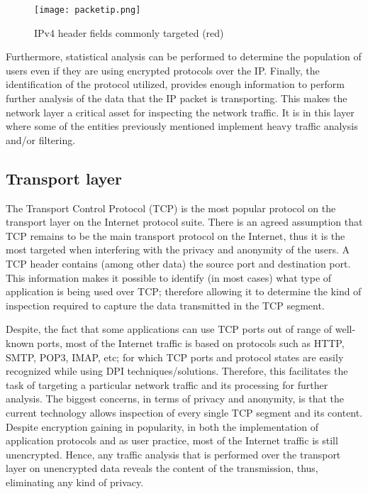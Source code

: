 \documentclass[conference]{IEEEtran}
\begin{document}
\begin{figure}[h]
  \centering
  \captionsetup{justification=centering}
  \texttt{[image: packetip.png]}
  \caption{IPv4 header fields commonly targeted (red)}
\end{figure}



Furthermore, statistical analysis can
be performed to determine the population of users even if they are
using encrypted protocols over the IP\cite{SWARM}. Finally, the
identification of the protocol utilized, provides enough information
to perform further analysis of the data that the IP packet is
transporting. This makes the network layer a critical asset for
inspecting the network traffic. It is in this layer where
some of the entities previously mentioned implement heavy traffic
analysis and/or filtering.

\subsection{Transport layer}

The Transport Control Protocol (TCP) is the most popular protocol
on the transport layer on the Internet protocol suite. There is an
agreed assumption that TCP remains to be the main transport protocol
on the Internet, thus it is the most targeted when interfering with the
privacy and anonymity of the users. A TCP header contains (among other
data) the source port and destination port. This information makes it
possible to identify (in most cases) what type of application
is being used over TCP; therefore allowing it to determine the kind of
inspection required to capture the data transmitted in the TCP
segment. 

Despite, the fact that some applications can use TCP ports out of range
of well-known ports, most of the Internet traffic is based on
protocols such as HTTP, SMTP, POP3, IMAP, etc; for which TCP ports and
protocol states are easily recognized while using DPI
techniques/solutions. Therefore, this facilitates the task of targeting
a particular network traffic and its processing for further
analysis. The biggest concerns, in terms of privacy and anonymity, is
that the current technology allows inspection of every single TCP segment
and its content. Despite encryption gaining in popularity, in both the
implementation of application protocols and as user practice, most of
the Internet traffic is still unencrypted. Hence, any traffic analysis
that is performed over the transport layer on unencrypted data
reveals the content of the transmission, thus, eliminating any kind of
privacy. 
\end{document}
